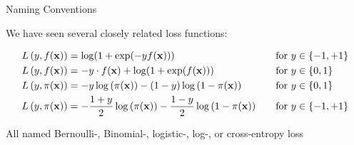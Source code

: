 \documentclass[11pt,compress,t,notes=noshow, xcolor=table]{beamer}
\begin{document}
\begin{vbframe}{Naming Conventions}

We have seen several closely related loss functions: 

\begin{alignat*}{3} L\left(y, f(\mathbf{x})\right)    &= \log(1+\exp(-yf(\mathbf{x}))) &&\quad \text{for } y \in \{-1, +1\} \\ L\left(y, f(\mathbf{x})\right)    &= - y \cdot f(\mathbf{x}) + \log(1 + \exp(f(\mathbf{x}))) &&\quad \text{for } y \in \{0, 1\} \\ L\left(y, \pi(\mathbf{x})\right)  &= - y \log \left(\pi(\mathbf{x})\right) - (1 - y) \log \left(1 - \pi(\mathbf{x})\right) &&\quad \text{for } y \in \{0, 1\} \\ L\left(y, \pi(\mathbf{x})\right)  &= - \frac{1 + y}{2} \log\left(\pi(\mathbf{x})\right) - \frac{1 - y}{2} \log\left(1 - \pi(\mathbf{x})\right) &&\quad \text{for } y \in \{-1, +1\} \end{alignat*}



\lz

All named Bernoulli-, Binomial-, logistic-, log-, or cross-entropy loss

\end{vbframe}
\end{document}
